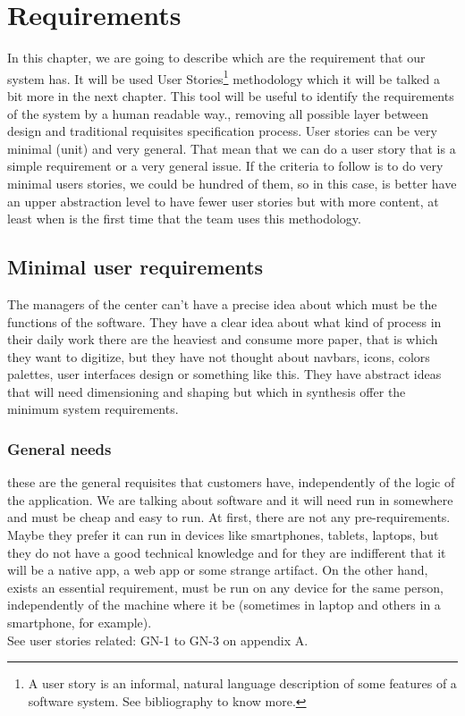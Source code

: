 \chapter{Requirements}

In this chapter, we are going to describe which are the requirement that our system has.
It will be used User Stories\footnote{A user story is an informal, natural language
description of some features of a software system. See bibliography to know more.}
methodology which it will be talked a bit more in the next chapter.
This tool will be useful to identify the requirements of the system by a
human readable way., removing all possible layer between design and traditional
requisites specification process.
\intro
User stories can be very minimal (unit) and very general. That mean that we
can do a user story that is a simple requirement or a very general issue.
If the criteria to follow is to do very minimal users stories, we could be
hundred of them, so in this case, is better have an upper abstraction level
to have fewer user stories but with more content, at least when is the
first time that the team uses this methodology.

\section{Minimal user requirements}

The managers of the center can't have a precise idea about which must be the
functions of the software. They have a clear idea about what kind of process in
their daily work there are the heaviest and consume more paper, that is which
they want to digitize, but they have not thought about navbars, icons, colors palettes,
user interfaces design or something like this.  They have abstract ideas that will
need dimensioning and shaping but which in synthesis offer the minimum system requirements.

\subsection{General needs}

these are the general requisites that customers have, independently of the logic of the application.
We are talking about software and it will need run in somewhere and must be cheap
and easy to run.
At first, there are not any pre-requirements. Maybe they prefer it can run in
devices like smartphones, tablets, laptops,
but they do not have a good technical knowledge and for they are indifferent that
it will be a native app, a web app or some strange artifact.
\intro
On the other hand, exists an essential requirement, must be run on any device for
the same person, independently of the machine where it be (sometimes in laptop
and others in a smartphone, for example).
\\
See user stories related: GN-1 to GN-3 on appendix A.


